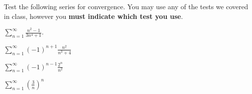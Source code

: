 \documentclass[12pt]{amsart}
\begin{document}
Test the following series for convergence.
You may use any of the tests we covered in class, however you {\bf must indicate which test you use}.

\begin{thm}
  $\displaystyle{\sum_{n=1}^\infty \frac{n^2 - 1}{3n^4 + 1}}.$
\end{thm}

\newpage

\begin{thm}
  $\displaystyle{\sum_{n=1}^\infty (-1)^{n+1}\frac{n^2}{n^3 + 4}}$
\end{thm}

\newpage

\begin{thm}
  $\displaystyle{\sum_{n=1}^\infty (-1)^{n-1}\frac{2^n}{n^2}}$
\end{thm}

\newpage

\begin{thm}
  $\displaystyle{\sum_{n=1}^\infty \left(\frac{3}{n}\right)^n}$
\end{thm}
\end{document}
